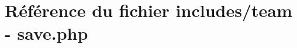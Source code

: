 \hypertarget{team_01-_01save_8php}{}\section{Référence du fichier includes/team -\/ save.\+php}
\label{team_01-_01save_8php}
